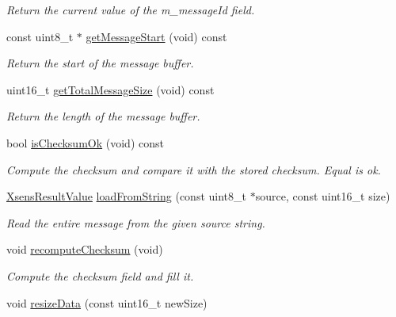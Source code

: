\begin{DoxyCompactItemize}
\begin{DoxyCompactList}\small\item\em \-Return the current value of the m\-\_\-message\-Id field. \end{DoxyCompactList}\item 
const uint8\-\_\-t $\ast$ \hyperlink{classxsens_1_1Message_a1c062f77b4440c409591b48c953b87d2}{get\-Message\-Start} (void) const 
\begin{DoxyCompactList}\small\item\em \-Return the start of the message buffer. \end{DoxyCompactList}\item 
uint16\-\_\-t \hyperlink{classxsens_1_1Message_a75725a5fd44e7db82fac386f29dd97df}{get\-Total\-Message\-Size} (void) const 
\begin{DoxyCompactList}\small\item\em \-Return the length of the message buffer. \end{DoxyCompactList}\item 
\hypertarget{classxsens_1_1Message_a0dd5d745c647d32a9a9babf4c5d33dcd}{bool \hyperlink{classxsens_1_1Message_a0dd5d745c647d32a9a9babf4c5d33dcd}{is\-Checksum\-Ok} (void) const }\label{classxsens_1_1Message_a0dd5d745c647d32a9a9babf4c5d33dcd}

\begin{DoxyCompactList}\small\item\em \-Compute the checksum and compare it with the stored checksum. \-Equal is ok. \end{DoxyCompactList}\item 
\hyperlink{group__enums_ga822a2260a20af524029eef9e9a51ff6f}{\-Xsens\-Result\-Value} \hyperlink{classxsens_1_1Message_ae31a715b5812028284e8fa4a87e987ab}{load\-From\-String} (const uint8\-\_\-t $\ast$source, const uint16\-\_\-t size)
\begin{DoxyCompactList}\small\item\em \-Read the entire message from the given source string. \end{DoxyCompactList}\item 
void \hyperlink{classxsens_1_1Message_af78aa09b0081b433c06cff079b91e5bf}{recompute\-Checksum} (void)
\begin{DoxyCompactList}\small\item\em \-Compute the checksum field and fill it. \end{DoxyCompactList}\item 
\hypertarget{classxsens_1_1Message_af81930339d692a53251c3dc66f996218}{void \hyperlink{classxsens_1_1Message_af81930339d692a53251c3dc66f996218}{resize\-Data} (const uint16\-\_\-t new\-Size)}\label{classxsens_1_1Message_af81930339d692a53251c3dc66f996218}


\end{DoxyCompactItemize}
